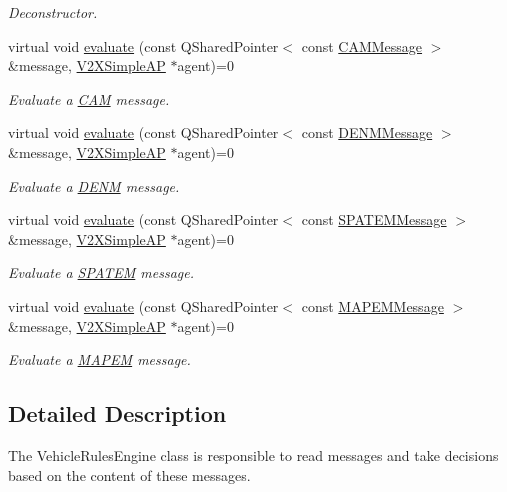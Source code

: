 \begin{DoxyCompactItemize}
\begin{DoxyCompactList}\small\item\em Deconstructor. \end{DoxyCompactList}\item 
virtual void \hyperlink{classV2XRulesEngine_ada3feb1787443ed73cddd6cf0594774d}{evaluate} (const Q\+Shared\+Pointer$<$ const \hyperlink{classCAMMessage}{C\+A\+M\+Message} $>$ \&message, \hyperlink{classV2XSimpleAP}{V2\+X\+Simple\+AP} $\ast$agent)=0
\begin{DoxyCompactList}\small\item\em Evaluate a \hyperlink{structCAM}{C\+AM} message. \end{DoxyCompactList}\item 
virtual void \hyperlink{classV2XRulesEngine_a17fb61ee361a65cf2c17c5e836beecb4}{evaluate} (const Q\+Shared\+Pointer$<$ const \hyperlink{classDENMMessage}{D\+E\+N\+M\+Message} $>$ \&message, \hyperlink{classV2XSimpleAP}{V2\+X\+Simple\+AP} $\ast$agent)=0
\begin{DoxyCompactList}\small\item\em Evaluate a \hyperlink{structDENM}{D\+E\+NM} message. \end{DoxyCompactList}\item 
virtual void \hyperlink{classV2XRulesEngine_a5ee90d966d5828c7f28dea45c9000e38}{evaluate} (const Q\+Shared\+Pointer$<$ const \hyperlink{classSPATEMMessage}{S\+P\+A\+T\+E\+M\+Message} $>$ \&message, \hyperlink{classV2XSimpleAP}{V2\+X\+Simple\+AP} $\ast$agent)=0
\begin{DoxyCompactList}\small\item\em Evaluate a \hyperlink{structSPATEM}{S\+P\+A\+T\+EM} message. \end{DoxyCompactList}\item 
virtual void \hyperlink{classV2XRulesEngine_a49992f684bc9761d4bec9ebe142131f0}{evaluate} (const Q\+Shared\+Pointer$<$ const \hyperlink{classMAPEMMessage}{M\+A\+P\+E\+M\+Message} $>$ \&message, \hyperlink{classV2XSimpleAP}{V2\+X\+Simple\+AP} $\ast$agent)=0
\begin{DoxyCompactList}\small\item\em Evaluate a \hyperlink{structMAPEM}{M\+A\+P\+EM} message. \end{DoxyCompactList}\end{DoxyCompactItemize}


\subsection{Detailed Description}
The Vehicle\+Rules\+Engine class is responsible to read messages and take decisions based on the content of these messages. 

